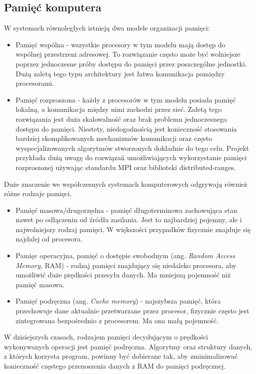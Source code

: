 \documentclass[a4paper,12pt]{book} %
\begin{document}
\subsection{Pamięć komputera}
W systemach równoległych istnieją dwa modele organizacji pamięci:
\begin{itemize}
	\item Pamięć wspólna - wszystkie procesory w tym modelu mają dostęp do wspólnej przestrzeni adresowej. To rozwiązanie często może być wolniejsze poprzez jednoczesne próby dostępu do pamięci przez poszczególne jednostki. Dużą zaletą tego typu architektury jest łatwa komunikacja pomiędzy procesorami.
	\item Pamięć rozproszona - każdy z procesorów w tym modelu posiada pamięć lokalną, a komunikacja między nimi zachodzi przez sieć. Zaletą tego rozwiązania jest duża skalowalność oraz brak problemu jednoczesnego dostępu do pamięci. Niestety, niedogodnością jest konieczność stosowania bardziej skomplikowanych mechanizmów komunikacji oraz często wyspecjalizowanych algorytmów stworzonych dokładnie do tego celu. Projekt przykłada dużą uwagę do rozwiązań umożliwiających wykorzystanie pamięci rozproszonej używając standardu MPI oraz biblioteki distributed-ranges.
\end{itemize}
Duże znaczenie we współczesnych systemach komputerowych odgrywają również różne rodzaje pamięci.
\begin{itemize}
	\item Pamięć masowa/drugorzędna - pamięć długoterminowa zachowująca stan nawet po odłączeniu od źródła zasilania. Jest to najbardziej pojemny, ale i najwolniejszy rodzaj pamięci. W większości przypadków fizycznie znajduje się najdalej od procesora.
	\item Pamięc operacyjna, pamięć o dostępie swobodnym (ang. \emph{Random Access Memory}, RAM) - rodzaj pamięci znajdujący się niedaleko procesora, aby umożliwić duże prędkości przesyłu danych. Ma mniejszą pojemność niż pamięć masowa.
	\item Pamięć podręczna (ang. \emph{Cache memory}) - najszybsza pamięć, która przechowuje dane aktualnie przetwarzane przez procesor, fizycznie często jest zintegrowana bezpośrednio z procesorem. Ma ona małą pojemność.
\end{itemize}
W dzisiejszych czasach, rodzajem pamięci decydującym o prędkości wykonywanych operacji jest pamięć podręczna. Algorytmy oraz struktury danych, z których korzysta program, powinny być dobierane tak, aby zminimalizować konieczność częstego przenoszenia danych z RAM do pamięci podręcznej.
\end{document}
